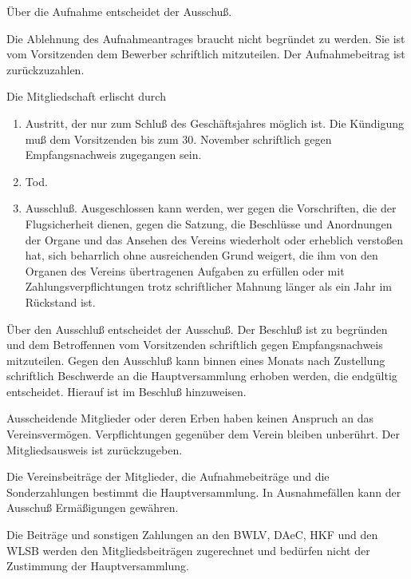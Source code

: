 \documentclass[10pt,a4paper,parskip=half]{scrartcl}
\begin{document}
\begin{contract}
\begin{multicols}{2}
    Über die Aufnahme entscheidet der Ausschuß.
    
    Die Ablehnung des Aufnahmeantrages braucht nicht begründet zu werden.
    Sie ist vom Vorsitzenden dem Bewerber schriftlich mitzuteilen.
    Der Aufnahmebeitrag ist zurückzuzahlen.
    
    Die Mitgliedschaft erlischt durch
    \begin{enumerate}[label=\alph*)]
      \item Austritt,
            der nur zum Schluß des Geschäftsjahres möglich ist.
            Die Kündigung muß dem Vorsitzenden bis zum 30. November schriftlich gegen Empfangsnachweis zugegangen sein.
      \item Tod.
            
      \item{Ausschluß.} Ausgeschlossen kann werden,
            wer gegen die Vorschriften,
            die der Flugsicherheit dienen,
            gegen die Satzung,
            die Beschlüsse und Anordnungen der Organe und das Ansehen des Vereins wiederholt oder erheblich verstoßen hat,
            sich beharrlich ohne ausreichenden Grund weigert,
            die ihm von den Organen des Vereins übertragenen Aufgaben zu erfüllen oder mit Zahlungsverpflichtungen trotz schriftlicher Mahnung länger als ein Jahr im Rückstand ist.
    \end{enumerate}
    
    Über den Ausschluß entscheidet der Ausschuß.
    Der Beschluß ist zu begründen und dem Betroffennen vom Vorsitzenden schriftlich gegen Empfangsnachweis mitzuteilen.
    Gegen den Ausschluß kann binnen eines Monats nach Zustellung schriftlich Beschwerde an die
    Hauptversammlung erhoben werden,
    die endgültig entscheidet.
    Hierauf ist im Beschluß hinzuweisen.
    
    Ausscheidende Mitglieder oder deren Erben haben keinen Anspruch an das Vereinsvermögen.
    Verpflichtungen gegenüber dem Verein bleiben unberührt.
    Der Mitgliedsausweis ist zurückzugeben.
    
    Die Vereinsbeiträge der Mitglieder,
    die Aufnahmebeiträge und die Sonderzahlungen bestimmt die Hauptversammlung.
    In Ausnahmefällen kann der Ausschuß Ermäßigungen gewähren.
    
    Die Beiträge und sonstigen Zahlungen an den BWLV,
    DAeC,
    HKF und den WLSB werden den Mitgliedsbeiträgen zugerechnet und bedürfen nicht der Zustimmung der Hauptversammlung.
    

\end{multicols}
\end{contract}
\end{document}
